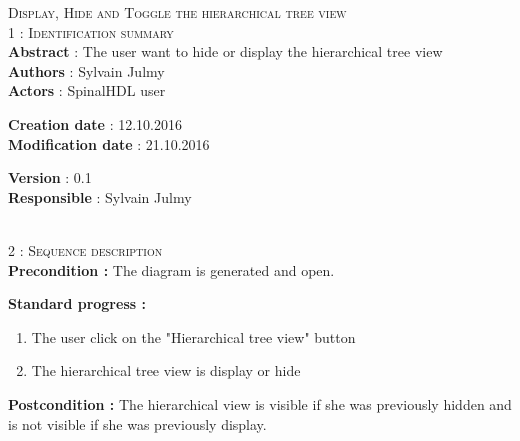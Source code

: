 \begin{flushleft}
    \textsc{\huge Display, Hide and Toggle the hierarchical tree view}\\[0.5cm]

    \BlackLine
    \textsc{\Large 1 : Identification summary}\\[0.3cm]

        \textbf{\large Abstract} : The user want to hide or display the hierarchical tree view \\[0.1cm]

        \textbf{\large Authors} : Sylvain Julmy \\[0.3cm]			

        \textbf{\large Actors} : SpinalHDL user \\[0.1cm]	
    \begin{minipage}{0.40\textwidth}
        \begin{flushleft}	
            \textbf{\large Creation date} : 12.10.2016 \\[0.1cm]

            \textbf{\large Modification date} : 21.10.2016 \\[0.1cm]
        \end{flushleft}
    \end{minipage}
    \begin{minipage}{0.40\textwidth}
        \begin{flushleft}
            \textbf{\large Version} : 0.1 \\[0.1cm]

            \textbf{\large Responsible} : Sylvain Julmy \\[0.1cm]
        \end{flushleft}
    \end{minipage}
    \\[0.5cm]
    \BlackLine
    \textsc{\Large 2 : Sequence description}\\[0.3cm]

    \textbf{\large Precondition :} The diagram is generated and open.

    \textbf{\large  Standard progress :}
    \begin{enumerate}[nosep]
        \item The user click on the "Hierarchical tree view" button
        \item The hierarchical tree view is display or hide
    \end{enumerate}

    \textbf{\large Postcondition :} The hierarchical view is visible if she was previously hidden and is not visible if she was previously display.


\end{flushleft}
